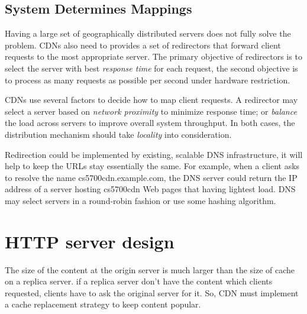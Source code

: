 \documentclass{elegantpaper}
\begin{document}
\subsection{System Determines Mappings}
Having a large set of geographically distributed servers does not fully solve the problem. CDNs also need to provides a set of redirectors that forward client requests to the most appropriate server. The primary objective of redirectors is to select the server with best \textit{response time} for each request, the second objective  is to process as many requests as possible per second under hardware restriction. 

CDNs use several factors to decide how to map client requests. A redirector may select a server based on \textit{network proximity} to minimize response time; or \textit{balance} the load across servers to improve overall system throughput. In both cases, the distribution mechanism should take \textit{locality} into consideration. 

Redirection could be implemented by existing, scalable DNS infrastructure, it will help to keep the URLs stay essentially the same. For example, when a client asks to resolve the name cs5700cdn.example.com, the DNS server could return the IP address of a server hosting cs5700cdn Web pages that having lightest load. DNS may select servers in a round-robin fashion or use some hashing algorithm.

\section{HTTP server design}
The size of the content at the origin server is much larger than the size of cache on a replica server. if a replica server don't have the content which clients requested, clients have to ask the original server for it. So, CDN must implement a cache replacement strategy to keep content popular.
\end{document}
